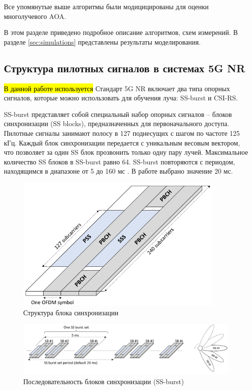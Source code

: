 Все упомянутые выше алгоритмы были модицицированы для оценки многолучевого AOA.

В этом разделе приведено подробное описание алгоритмов, схем измерений. В
разделе \ref{sec:simulations} представлены результаты моделирования.


\subsection{Структура пилотных сигналов в системах 5G NR}
\label{sec:ssburst}

\hl{В данной работе используется }
Стандарт 5G NR включает два типа опорных сигналов, которые можно использовать для обучения луча: SS-burst
и CSI-RS.

SS-burst представляет собой специальный набор опорных сигналов -- блоков
синхронизации (SS blocks), предназначенных для первоначального доступа. Пилотные
сигналы занимают полосу в 127 поднесущих с шагом по частоте 125 кГц. 
Каждый блок синхронизации передается с уникальным весовым вектором, что 
позволяет за один SS блок прозвонить только одну пару лучей.  
Максимальное количество SS блоков в SS-burst равно 64. 
SS-burst повторяются с периодом, находящимся  в диапазоне от 5 до 160 мс \cite{Dahlman2018}.  
В работе выбрано значение 20 мс.

\begin{figure}[h!]
    \centering
    \includegraphics[width=0.4\linewidth]{figs/fig4.1}
    \caption{Структура блока синхронизации}
    \label{fig:4.1}
\end{figure}
\begin{figure}[h!]
    \centering
    \includegraphics[width=\linewidth]{figs/fig4.2}
    \caption{Последовательность блоков синхронизации (SS-burst)}
    \label{fig:4.2}
\end{figure}

